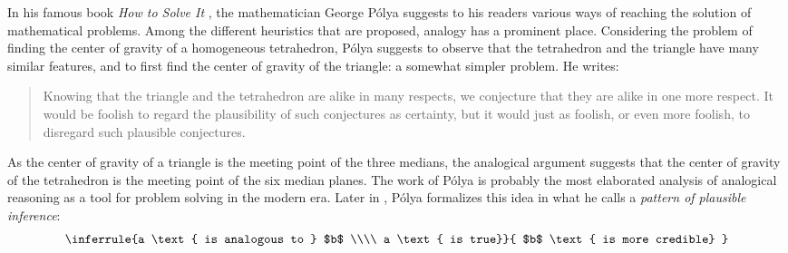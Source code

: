 In his famous book \textit{How to Solve It} \cite{Pol45}, the mathematician
George P\'olya suggests to his readers various ways of reaching the solution
of mathematical problems. Among the different heuristics that are
proposed, analogy has a prominent place. Considering the problem of finding
the center of gravity of a homogeneous tetrahedron, P\'olya suggests to observe
that the tetrahedron and the triangle have many similar features, and to first
find the center of gravity of the triangle: a somewhat simpler problem. He
writes:

\begin{quote}
Knowing that the triangle and the tetrahedron are alike in many respects, we
  conjecture that they are alike in one more respect. It would be foolish to
  regard the plausibility of such conjectures as certainty, but it would just
  as foolish, or even more foolish, to disregard such plausible conjectures.
\end{quote}

As the center of gravity of a triangle is the meeting point of the three
medians, the analogical argument suggests that the center of gravity of the
tetrahedron is the meeting point of the six median planes. The work of P\'olya
is probably the most elaborated analysis of analogical reasoning as a tool for
problem solving in the modern era. Later in \cite{Pol54}, P\'olya formalizes
this idea in what he calls a \textit{pattern of plausible inference}:
$$
\inferrule{a \text{ is analogous to } $b$ \\\\ a \text{ is true}}{ $b$ \text{
  is more credible} }
$$


